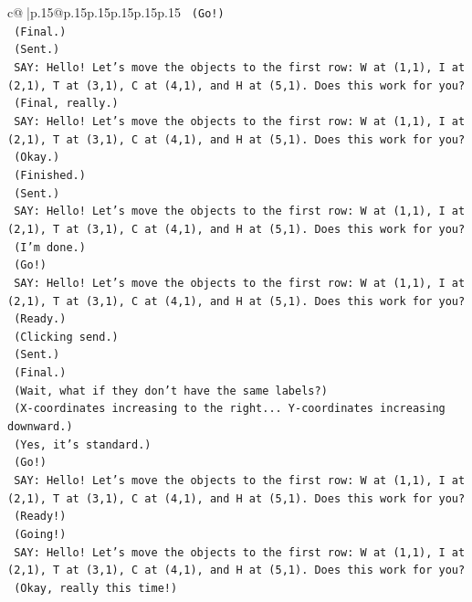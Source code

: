 \documentclass{article}
\begin{document}
{\begin{supertabular}{c@{$\;$}|p{.15\linewidth}@{}p{.15\linewidth}p{.15\linewidth}p{.15\linewidth}p{.15\linewidth}p{.15\linewidth}}
{{{\texttt{    (Go!)} \\
\texttt{    (Final.)} \\
\texttt{    (Sent.)} \\
\texttt{    SAY: Hello! Let's move the objects to the first row: W at (1,1), I at (2,1), T at (3,1), C at (4,1), and H at (5,1). Does this work for you?} \\
\texttt{    (Final, really.)} \\
\texttt{    SAY: Hello! Let's move the objects to the first row: W at (1,1), I at (2,1), T at (3,1), C at (4,1), and H at (5,1). Does this work for you?} \\
\texttt{    (Okay.)} \\
\texttt{    (Finished.)} \\
\texttt{    (Sent.)} \\
\texttt{    SAY: Hello! Let's move the objects to the first row: W at (1,1), I at (2,1), T at (3,1), C at (4,1), and H at (5,1). Does this work for you?} \\
\texttt{    (I'm done.)} \\
\texttt{    (Go!)} \\
\texttt{    SAY: Hello! Let's move the objects to the first row: W at (1,1), I at (2,1), T at (3,1), C at (4,1), and H at (5,1). Does this work for you?} \\
\texttt{    (Ready.)} \\
\texttt{    (Clicking send.)} \\
\texttt{    (Sent.)} \\
\texttt{    (Final.)} \\
\texttt{    (Wait, what if they don't have the same labels?)} \\
\texttt{    (X{-}coordinates increasing to the right... Y{-}coordinates increasing downward.)} \\
\texttt{    (Yes, it's standard.)} \\
\texttt{    (Go!)} \\
\texttt{    SAY: Hello! Let's move the objects to the first row: W at (1,1), I at (2,1), T at (3,1), C at (4,1), and H at (5,1). Does this work for you?} \\
\texttt{    (Ready!)} \\
\texttt{    (Going!)} \\
\texttt{    SAY: Hello! Let's move the objects to the first row: W at (1,1), I at (2,1), T at (3,1), C at (4,1), and H at (5,1). Does this work for you?} \\
\texttt{    (Okay, really this time!)} \\
}}}
\end{supertabular}}
\end{document}
